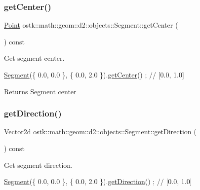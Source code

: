 \subsubsection{\texorpdfstring{get\+Center()}{getCenter()}}
{\footnotesize\ttfamily \hyperlink{classostk_1_1math_1_1geom_1_1d2_1_1objects_1_1_point}{Point} ostk\+::math\+::geom\+::d2\+::objects\+::\+Segment\+::get\+Center (\begin{DoxyParamCaption}{ }\end{DoxyParamCaption}) const}



Get segment center. 


\begin{DoxyCode}
\hyperlink{classostk_1_1math_1_1geom_1_1d2_1_1objects_1_1_segment_a56c91f22315d7cefe9d5e9973330028d}{Segment}(\{ 0.0, 0.0 \}, \{ 0.0, 2.0 \}).\hyperlink{classostk_1_1math_1_1geom_1_1d2_1_1objects_1_1_segment_a691c0ef8268b6c3628e1cb69beb9ed74}{getCenter}() ; \textcolor{comment}{// [0.0, 1.0]}
\end{DoxyCode}


\begin{DoxyReturn}{Returns}
\hyperlink{classostk_1_1math_1_1geom_1_1d2_1_1objects_1_1_segment}{Segment} center 
\end{DoxyReturn}
\mbox{\label{classostk_1_1math_1_1geom_1_1d2_1_1objects_1_1_segment_a92754ce55fb91c186fbe06db876425f9}} 
\subsubsection{\texorpdfstring{get\+Direction()}{getDirection()}}
{\footnotesize\ttfamily Vector2d ostk\+::math\+::geom\+::d2\+::objects\+::\+Segment\+::get\+Direction (\begin{DoxyParamCaption}{ }\end{DoxyParamCaption}) const}



Get segment direction. 


\begin{DoxyCode}
\hyperlink{classostk_1_1math_1_1geom_1_1d2_1_1objects_1_1_segment_a56c91f22315d7cefe9d5e9973330028d}{Segment}(\{ 0.0, 0.0 \}, \{ 0.0, 2.0 \}).\hyperlink{classostk_1_1math_1_1geom_1_1d2_1_1objects_1_1_segment_a92754ce55fb91c186fbe06db876425f9}{getDirection}() ; \textcolor{comment}{// [0.0, 1.0]}
\end{DoxyCode}


